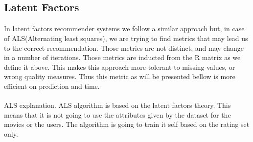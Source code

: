 \subsection{Latent Factors}
\paragraph{} In latent factors recommender systems we follow a similar approach but, in case of ALS(Alternating least squares), we are trying to find metrics that may lead us to the correct recommendation. Those metrics are not distinct, and may change in a number of iterations. Those metrics are inducted from the R matrix as we define it above. This makes this approach more tolerant to missing values, or wrong quality measures. Thus this metric as will be presented bellow is more efficient on prediction and time.

\paragraph{} ALS explanation.
ALS algorithm is based on the latent factors theory. This means that it is not going to use the attributes given by the dataset for the movies or the users. The algorithm is going to train it self based on the rating set only.

